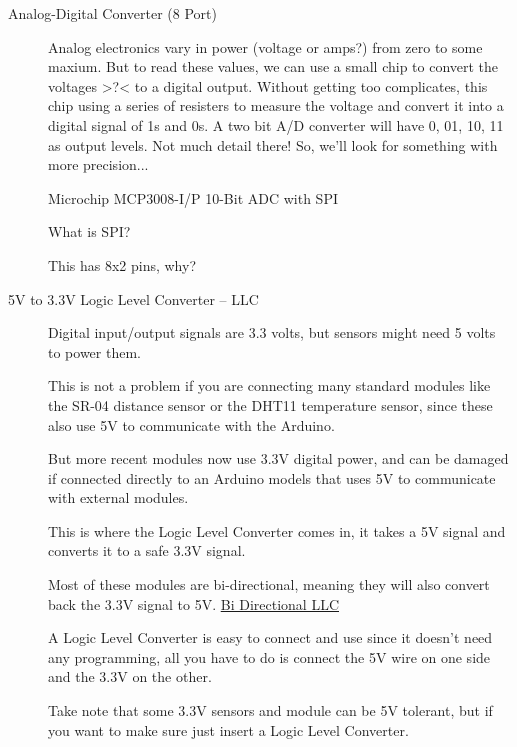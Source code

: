 \documentclass{article}\usepackage[]{graphicx}\usepackage[]{color}
\begin{document}
\begin{description}
\item[Analog-Digital Converter (8 Port)] Analog electronics vary in power (voltage or amps?) from zero to some maxium. But to read these values, we can use a small chip to convert the voltages >?< to a digital output. Without getting too complicates, this chip using a series of resisters to measure the voltage and convert it into a digital signal of 1s and 0s. A two bit A/D converter will have 0, 01, 10, 11 as output levels. Not much detail there!  So, we'll look for something with more precision...

Microchip MCP3008-I/P 10-Bit ADC with SPI  

What is SPI?

This has 8x2 pins, why?

\item[5V to 3.3V Logic Level Converter -- LLC] 
Digital input/output signals are 3.3 volts, but sensors might need 5 volts to power them.


This is not a problem if you are connecting many standard modules like the SR-04 distance sensor or the DHT11 temperature sensor, since these also use 5V to communicate with the Arduino.

But more recent modules now use 3.3V digital power, and can be damaged if connected directly to an Arduino models that uses 5V to communicate with external modules.

This is where the Logic Level Converter comes in, it takes a 5V signal and converts it to a safe 3.3V signal.

Most of these modules are bi-directional, meaning they will also convert back the 3.3V signal to 5V. \href{https://learn.sparkfun.com/tutorials/bi-directional-logic-level-converter-hookup-guide}{Bi Directional LLC}

A Logic Level Converter is easy to connect and use since it doesn’t need any programming, all you have to do is connect the 5V wire on one side and the 3.3V on the other.

Take note that some 3.3V sensors and module can be 5V tolerant, but if you want to make sure just insert a Logic Level Converter.


\end{description}
\end{document}
